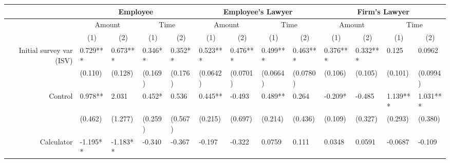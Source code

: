 \begin{tabular}{rrrrrrrrrrrrr}
\toprule
      & \multicolumn{4}{c}{Employee}  & \multicolumn{4}{c}{Employee's Lawyer} & \multicolumn{4}{c}{Firm's Lawyer} \\
\midrule
      & \multicolumn{2}{c}{Amount} & \multicolumn{2}{c}{Time} & \multicolumn{2}{c}{Amount} & \multicolumn{2}{c}{Time} & \multicolumn{2}{c}{Amount} & \multicolumn{2}{c}{Time} \\
      & \multicolumn{1}{c}{(1)} & \multicolumn{1}{c}{(2)} & \multicolumn{1}{c}{(1)} & \multicolumn{1}{c}{(2)} & \multicolumn{1}{c}{(1)} & \multicolumn{1}{c}{(2)} & \multicolumn{1}{c}{(1)} & \multicolumn{1}{c}{(2)} & \multicolumn{1}{c}{(1)} & \multicolumn{1}{c}{(2)} & \multicolumn{1}{c}{(1)} & \multicolumn{1}{c}{(2)} \\
Initial survey var (ISV) & \multicolumn{1}{l}{0.729***} & \multicolumn{1}{l}{0.673***} & \multicolumn{1}{l}{0.346**} & \multicolumn{1}{l}{0.352**} & \multicolumn{1}{l}{0.523***} & \multicolumn{1}{l}{0.476***} & \multicolumn{1}{l}{0.499***} & \multicolumn{1}{l}{0.463***} & \multicolumn{1}{l}{0.376***} & \multicolumn{1}{l}{0.332***} & \multicolumn{1}{l}{0.125} & \multicolumn{1}{l}{0.0962} \\
      & \multicolumn{1}{l}{(0.110)} & \multicolumn{1}{l}{(0.128)} & \multicolumn{1}{l}{(0.169)} & \multicolumn{1}{l}{(0.176)} & \multicolumn{1}{l}{(0.0642)} & \multicolumn{1}{l}{(0.0701)} & \multicolumn{1}{l}{(0.0664)} & \multicolumn{1}{l}{(0.0780)} & \multicolumn{1}{l}{(0.106)} & \multicolumn{1}{l}{(0.105)} & \multicolumn{1}{l}{(0.101)} & \multicolumn{1}{l}{(0.0994)} \\
Control & \multicolumn{1}{l}{0.978**} & \multicolumn{1}{l}{2.031} & \multicolumn{1}{l}{0.452*} & \multicolumn{1}{l}{0.536} & \multicolumn{1}{l}{0.445**} & \multicolumn{1}{l}{-0.493} & \multicolumn{1}{l}{0.489**} & \multicolumn{1}{l}{0.264} & \multicolumn{1}{l}{-0.209*} & \multicolumn{1}{l}{-0.485} & \multicolumn{1}{l}{1.139***} & \multicolumn{1}{l}{1.031***} \\
      & \multicolumn{1}{l}{(0.462)} & \multicolumn{1}{l}{(1.277)} & \multicolumn{1}{l}{(0.259)} & \multicolumn{1}{l}{(0.567)} & \multicolumn{1}{l}{(0.215)} & \multicolumn{1}{l}{(0.697)} & \multicolumn{1}{l}{(0.214)} & \multicolumn{1}{l}{(0.436)} & \multicolumn{1}{l}{(0.109)} & \multicolumn{1}{l}{(0.327)} & \multicolumn{1}{l}{(0.293)} & \multicolumn{1}{l}{(0.380)} \\
Calculator & \multicolumn{1}{l}{-1.195**} & \multicolumn{1}{l}{-1.183**} & \multicolumn{1}{l}{-0.340} & \multicolumn{1}{l}{-0.367} & \multicolumn{1}{l}{-0.197} & \multicolumn{1}{l}{-0.322} & \multicolumn{1}{l}{0.0759} & \multicolumn{1}{l}{0.111} & \multicolumn{1}{l}{0.0348} & \multicolumn{1}{l}{0.0591} & \multicolumn{1}{l}{-0.0687} & \multicolumn{1}{l}{-0.109} \\

\end{tabular}

